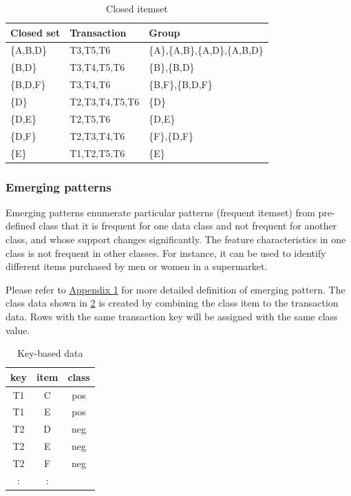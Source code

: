 \begin{table}[htbp]
\begin{center}

\caption{Closed itemset\label{tbl:close}}
{\small
\begin{tabular}{lll}
\hline
Closed set&Transaction&Group \\
\hline
\{A,B,D\} & T3,T5,T6       & \{A\},\{A,B\},\{A,D\},\{A,B,D\} \\
\{B,D\}   & T3,T4,T5,T6    & \{B\},\{B,D\}  \\
\{B,D,F\} & T3,T4,T6       & \{B,F\},\{B,D,F\} \\
\{D\}     & T2,T3,T4,T5,T6 & \{D\} \\
\{D,E\}   & T2,T5,T6       & \{D,E\}    \\
\{D,F\}   & T2,T3,T4,T6    & \{F\},\{D,F\} \\
\{E\}     & T1,T2,T5,T6    & \{E\} \\ \hline
\end{tabular} 
}

\end{center}
\end{table} 



\subsubsection*{Emerging patterns}
Emerging patterns enumerate particular patterns (frequent itemset) from pre-defined class that it is frequent for one data class and not frequent for another class, and whose support changes significantly.
The feature characteristics in one class is not frequent in other classes. 
For instance, it can be used to identify different items purchased by men or women in a supermarket.

Please refer to \hyperref[sect:ep]{Appendix 1} for more detailed definition of emerging pattern. 
The class data shown in \ref{tbl:class} is created by combining the class item to the transaction data.
Rows with the same transaction key will be assigned with the same class value. 
 
\begin{table}[htbp]
\begin{center}
\caption{Key-based data\label{tbl:class}}
{\small
\begin{tabular}{ccc}
\hline
key&item&class \\
\hline
T1&C&pos \\
T1&E&pos \\
T2&D&neg \\
T2&E&neg \\
T2&F&neg \\
:&: \\ \hline
\end{tabular}
}
\end{center}
\end{table}

